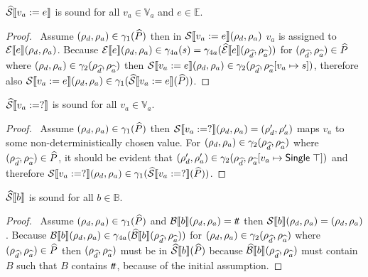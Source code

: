 \begin{conjecture}\label{thm:sound-assign}
    $\widehat{\mathcal{S}} \llbracket v_a := e \rrbracket$ is sound for all $v_a \in \mathbb{V}_a$ and $e \in \mathbb{E}$.
\end{conjecture}
\begin{proof}
    \pf\
    Assume $(\rho_{d}, \rho_{a}) \in \gamma_1(\widehat{P})$ then in $\mathcal{S} \llbracket v_a := e \rrbracket(\rho_{d}, \rho_{a})$ $v_a$ is assigned to $\mathcal{E}\llbracket e \rrbracket(\rho_{d}, \rho_{a})$. Because $\mathcal{E}\llbracket e \rrbracket(\rho_{d}, \rho_{a}) \in \gamma_{4a}(s) = \gamma_{4a}(\widehat{\mathcal{E}}\llbracket e \rrbracket(\rho_{\widehat{d}}, \rho_{\widehat{a}}))$ for $(\rho_{\widehat{d}}, \rho_{\widehat{a}}) \in \widehat{P}$ where $(\rho_{d}, \rho_{a}) \in \gamma_2(\rho_{\widehat{d}}, \rho_{\widehat{a}})$ then $\mathcal{S} \llbracket v_a := e \rrbracket(\rho_{d}, \rho_{a}) \in \gamma_2(\rho_{\widehat{d}}, \rho_{\widehat{a}}[v_a \mapsto s])$, therefore also $\mathcal{S} \llbracket v_a := e \rrbracket(\rho_{d}, \rho_{a})\in \gamma_1(\widehat{\mathcal{S}} \llbracket v_a := e \rrbracket(\widehat{P}))$.
\end{proof}

\begin{conjecture}\label{thm:sound-random}
    $\widehat{\mathcal{S}} \llbracket v_a := ? \rrbracket$ is sound for all $v_a \in \mathbb{V}_a$.
\end{conjecture}
\begin{proof}
    \pf\
    Assume $(\rho_{d}, \rho_{a}) \in \gamma_1(\widehat{P})$ then $\mathcal{S} \llbracket v_a := ? \rrbracket(\rho_{d}, \rho_{a}) = (\rho_{d}', \rho_{a}')$ maps $v_a$ to some non-deterministically chosen value.
    For $(\rho_{d}, \rho_{a}) \in \gamma_2(\rho_{\widehat{d}}, \rho_{\widehat{a}})$ where $(\rho_{\widehat{d}}, \rho_{\widehat{a}}) \in \widehat{P}$, it should be evident that $(\rho_{d}', \rho_{a}') \in \gamma_2(\rho_{\widehat{d}}, \rho_{\widehat{a}}[v_a \mapsto \mathsf{Single}\;\top])$ and therefore $\mathcal{S} \llbracket v_a := ? \rrbracket(\rho_{d}, \rho_{a}) \in \gamma_1(\widehat{\mathcal{S}} \llbracket v_a := ? \rrbracket(\widehat{P}))$.
\end{proof}

\begin{conjecture}\label{thm:sound-boolsem}
    $\widehat{\mathcal{S}} \llbracket b \rrbracket$ is sound for all $b \in \mathbb{B}$.
\end{conjecture}
\begin{proof}
    \pf\
    Assume $(\rho_{d}, \rho_{a}) \in \gamma_1(\widehat{P})$ and $\mathcal{B}\llbracket b \rrbracket(\rho_{d}, \rho_{a}) = t\!t$ then $\mathcal{S} \llbracket b \rrbracket(\rho_{d}, \rho_{a}) = (\rho_{d}, \rho_{a})$.
    Because $\mathcal{B}\llbracket b \rrbracket(\rho_{d}, \rho_{a}) \in \gamma_{4a}(\widehat{\mathcal{B}}\llbracket b \rrbracket(\rho_{\widehat{d}}, \rho_{\widehat{a}}))$ for $(\rho_{d}, \rho_{a}) \in \gamma_2(\rho_{\widehat{d}}, \rho_{\widehat{a}})$ where $(\rho_{\widehat{d}}, \rho_{\widehat{a}}) \in \widehat{P}$ then $(\rho_{\widehat{d}}, \rho_{\widehat{a}})$ must be in $\widehat{\mathcal{S}} \llbracket b \rrbracket(\widehat{P})$ because $\widehat{\mathcal{B}}\llbracket b \rrbracket(\rho_{\widehat{d}}, \rho_{\widehat{a}})$ must contain $B$ such that $B$ contains $t\!t$, because of the initial assumption.
\end{proof}

